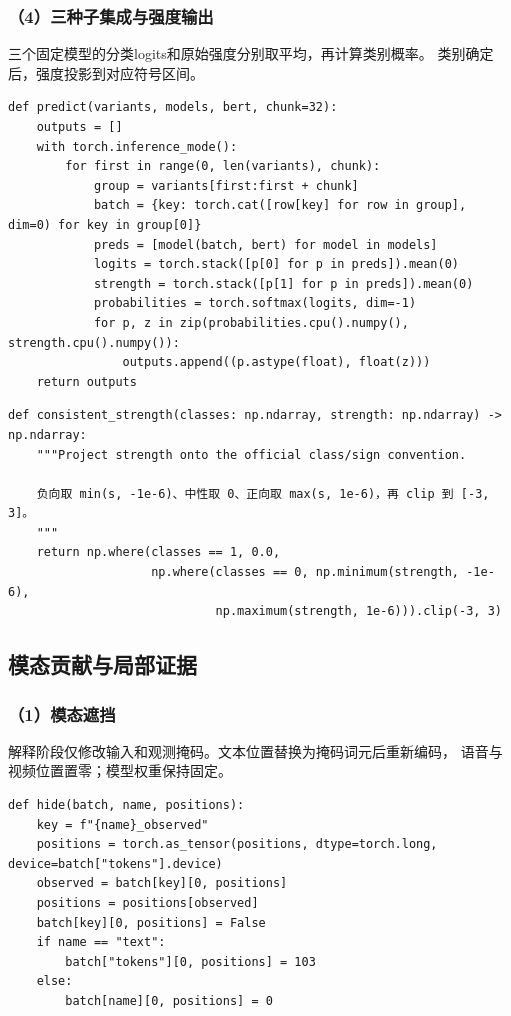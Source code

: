 \subsubsection*{（4）三种子集成与强度输出}
三个固定模型的分类logits和原始强度分别取平均，再计算类别概率。
类别确定后，强度投影到对应符号区间。

\begin{lstlisting}
def predict(variants, models, bert, chunk=32):
    outputs = []
    with torch.inference_mode():
        for first in range(0, len(variants), chunk):
            group = variants[first:first + chunk]
            batch = {key: torch.cat([row[key] for row in group], dim=0) for key in group[0]}
            preds = [model(batch, bert) for model in models]
            logits = torch.stack([p[0] for p in preds]).mean(0)
            strength = torch.stack([p[1] for p in preds]).mean(0)
            probabilities = torch.softmax(logits, dim=-1)
            for p, z in zip(probabilities.cpu().numpy(), strength.cpu().numpy()):
                outputs.append((p.astype(float), float(z)))
    return outputs
\end{lstlisting}

\begin{lstlisting}
def consistent_strength(classes: np.ndarray, strength: np.ndarray) -> np.ndarray:
    """Project strength onto the official class/sign convention.

    负向取 min(s, -1e-6)、中性取 0、正向取 max(s, 1e-6)，再 clip 到 [-3, 3]。
    """
    return np.where(classes == 1, 0.0,
                    np.where(classes == 0, np.minimum(strength, -1e-6),
                             np.maximum(strength, 1e-6))).clip(-3, 3)
\end{lstlisting}

\subsection{模态贡献与局部证据}
\subsubsection*{（1）模态遮挡}
解释阶段仅修改输入和观测掩码。文本位置替换为掩码词元后重新编码，
语音与视频位置置零；模型权重保持固定。

\begin{lstlisting}
def hide(batch, name, positions):
    key = f"{name}_observed"
    positions = torch.as_tensor(positions, dtype=torch.long, device=batch["tokens"].device)
    observed = batch[key][0, positions]
    positions = positions[observed]
    batch[key][0, positions] = False
    if name == "text":
        batch["tokens"][0, positions] = 103
    else:
        batch[name][0, positions] = 0
\end{lstlisting}

